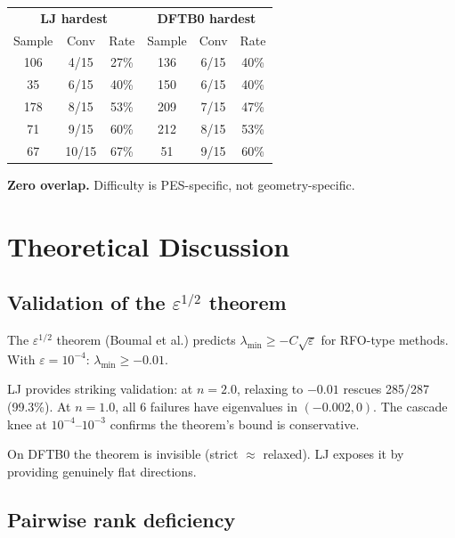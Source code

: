 \documentclass[11pt,a4paper]{article}
\theoremstyle{definition}
\begin{document}
\begin{center}\small
\begin{tabular}{ccc|ccc}
\toprule
\multicolumn{3}{c}{\textbf{\color{ljblue}LJ hardest}} &
\multicolumn{3}{c}{\textbf{\color{dftborange}DFTB0 hardest}} \\
Sample & Conv & Rate & Sample & Conv & Rate \\
\midrule
106 & 4/15 & 27\% & 136 & 6/15 & 40\% \\
35  & 6/15 & 40\% & 150 & 6/15 & 40\% \\
178 & 8/15 & 53\% & 209 & 7/15 & 47\% \\
71  & 9/15 & 60\% & 212 & 8/15 & 53\% \\
67  & 10/15 & 67\% & 51  & 9/15 & 60\% \\
\bottomrule
\end{tabular}
\end{center}

\textbf{Zero overlap.}  Difficulty is PES-specific, not geometry-specific.

\section{Theoretical Discussion}
\label{app:theory}

\subsection{Validation of the $\varepsilon^{1/2}$ theorem}

The $\varepsilon^{1/2}$ theorem (Boumal et al.) predicts
$\lambda_\text{min} \geq -C\sqrt{\varepsilon}$ for RFO-type methods.
With $\varepsilon = 10^{-4}$: $\lambda_\text{min} \geq -0.01$.

LJ provides striking validation: at $n{=}2.0$, relaxing to $-0.01$
rescues 285/287 (99.3\%).  At $n{=}1.0$, all 6 failures have eigenvalues
in $(-0.002, 0)$.  The cascade knee at $10^{-4}$--$10^{-3}$ confirms
the theorem's bound is conservative.

On DFTB0 the theorem is invisible (strict $\approx$ relaxed).  LJ
exposes it by providing genuinely flat directions.

\subsection{Pairwise rank deficiency}
\end{document}

